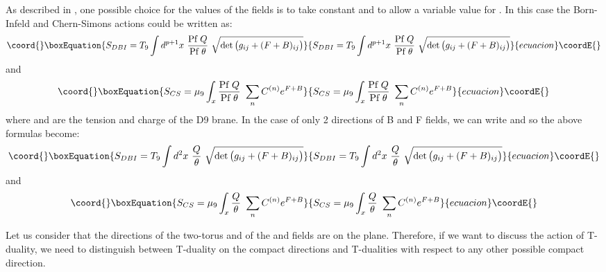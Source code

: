 \documentclass[a4paper,12pt]{article}
\begin{document}
As described in \cite{ms}, one possible choice for the values of the fields is
to take \coordHE{} constant and to allow a variable value for 
\coordHE{}. In this case the Born-Infeld and Chern-Simons actions could
be written as:
\begin{equation}\coord{}\boxEquation{
\label{dbi1}
 S_{DBI} =  T_9  \int d^{p+1} x~ {\mbox{Pf}~Q\over \mbox{Pf}~\theta} 
~\sqrt{\det\big(g_{ij} + (F + B)_{ij}\big)}
}{
S_{DBI} =  T_9  \int d^{p+1} x~ {\mbox{Pf}~Q\over \mbox{Pf}~\theta} 
~\sqrt{\det\big(g_{ij} + (F + B)_{ij}\big)}
}{ecuacion}\coordE{}\end{equation}
and 
\begin{equation}\coord{}\boxEquation{
\label{cs1}
 S_{CS} = \mu_9 \int_x {\mbox{Pf}~Q\over \mbox{Pf}~\theta}
~\sum_n C^{(n)} e^{F + B} 
}{
S_{CS} = \mu_9 \int_x {\mbox{Pf}~Q\over \mbox{Pf}~\theta}
~\sum_n C^{(n)} e^{F + B} 
}{ecuacion}\coordE{}\end{equation}
where \coordHE{} and \coordHE{} are the tension and charge of the D9 brane. In the
case of only 2 directions of B and F fields, we can write 
\coordHE{} and \coordHE{} 
so the above formulas become:
\begin{equation}\coord{}\boxEquation{
\label{dbi2}
S_{DBI} =  T_9  \int d^{2} x~ {Q \over \theta} 
 ~\sqrt{\det\big(g_{ij} + (F + B)_{ij}\big)}
}{
S_{DBI} =  T_9  \int d^{2} x~ {Q \over \theta} 
 ~\sqrt{\det\big(g_{ij} + (F + B)_{ij}\big)}
}{ecuacion}\coordE{}\end{equation}
and 
\begin{equation}\coord{}\boxEquation{
\label{cs2}
S_{CS} = \mu_9 \int_x {Q \over \theta}
 ~\sum_n C^{(n)} e^{F + B} 
}{
S_{CS} = \mu_9 \int_x {Q \over \theta}
 ~\sum_n C^{(n)} e^{F + B} 
}{ecuacion}\coordE{}\end{equation}

Let us consider that the directions of the two-torus \coordHE{} and of the \coordHE{} and 
\coordHE{} fields are on the \coordHE{} plane. Therefore, if we want to
discuss the action of T-duality, we need to distinguish between T-duality on
the compact \coordHE{} directions and T-dualities with respect to any other 
possible compact direction. 
\end{document}
